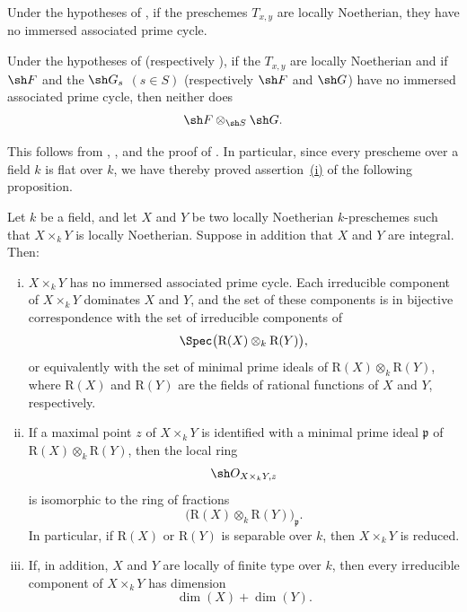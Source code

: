 \begin{corollary}[4.2.2]
\label{IV.4.2.2}
Under the hypotheses of , if the preschemes
$T_{x,y}$ are locally Noetherian, they have no immersed associated
prime cycle.
\end{corollary}

\begin{corollary}[4.2.3]
\label{IV.4.2.3}
Under the hypotheses of 
(respectively ), if the $T_{x,y}$ are locally Noetherian
and if $\sh F$ and the $\sh G_s$ $(s\in S)$
(respectively $\sh F$ and $\sh G$) have no immersed associated prime
cycle, then neither does
\[
\sh F\otimes_{\sh S}\sh G.
\]
\end{corollary}

This follows from , , and the proof of
.
In particular, since every prescheme over a field $k$ is flat over $k$,
we have thereby proved assertion~{\hyperlink{ega4.c04.sec.4-2-4-i}{(i)}} of the
following proposition.

\begin{proposition}[4.2.4]
\label{IV.4.2.4}
Let $k$ be a field, and let $X$ and $Y$ be two locally Noetherian
$k$-preschemes such that $X\times_k Y$ is locally Noetherian.
Suppose in addition that $X$ and $Y$ are integral.
Then:
\begin{enumerate}[(i)]
\item
{}
\label{IV.4.2.4.i}
$X\times_k Y$ has no immersed associated prime cycle.
Each irreducible component of $X\times_k Y$ dominates $X$ and $Y$, and
the set of these components is in bijective correspondence with the set
of irreducible components of
\[
\Spec\bigl(\mathrm R(X)\otimes_k\mathrm R(Y)\bigr),
\]
or equivalently with the set of minimal prime ideals of
$\mathrm R(X)\otimes_k\mathrm R(Y)$, where $\mathrm R(X)$ and
$\mathrm R(Y)$ are the fields of rational functions of $X$ and $Y$,
respectively.

\item
{}
\label{IV.4.2.4.ii}
If a maximal point $z$ of $X\times_k Y$ is identified with a minimal
prime ideal $\mathfrak p$ of
$\mathrm R(X)\otimes_k\mathrm R(Y)$, then the local ring
\[
\sh O_{X\times_k Y,z}
\]
is isomorphic to the ring of fractions
\[
\bigl(\mathrm R(X)\otimes_k\mathrm R(Y)\bigr)_{\mathfrak p}.
\]
In particular, if $\mathrm R(X)$ or $\mathrm R(Y)$ is separable over
$k$, then $X\times_k Y$ is reduced.


\item
{}
\label{IV.4.2.4.iii}
If, in addition, $X$ and $Y$ are locally of finite type over $k$, then
every irreducible component of $X\times_k Y$ has dimension
\[
\dim(X)+\dim(Y).
\]
\end{enumerate}
\end{proposition}

